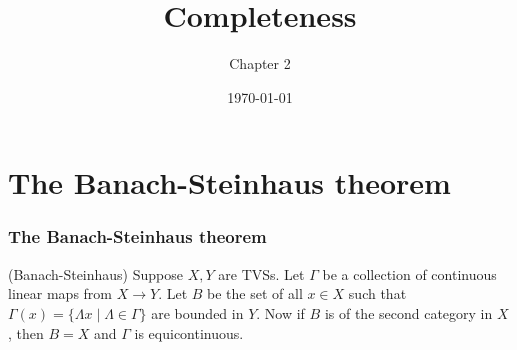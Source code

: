 \documentclass{beamer}
\title{Completeness}
\author{Chapter 2}
\institute{Functional Analysis}
\date{\today}
\begin{document}
\begin{frame}
\titlepage
\end{frame}

\section{The Banach-Steinhaus theorem}

\begin{frame}
\frametitle{The Banach-Steinhaus theorem}

\begin{theorem} (Banach-Steinhaus) Suppose $X,Y$ are TVSs. Let $\Gamma$ be a collection of continuous linear maps from $X \to Y$. Let $B$ be the set of all $x \in X$ such that $\Gamma(x) = \{\Lambda x\mid \Lambda \in \Gamma\}$ are bounded in $Y$. Now if $B$ is of the second category in $X$, then $B = X$ and $\Gamma$ is equicontinuous.
\end{theorem}

\end{frame}
\end{document}
